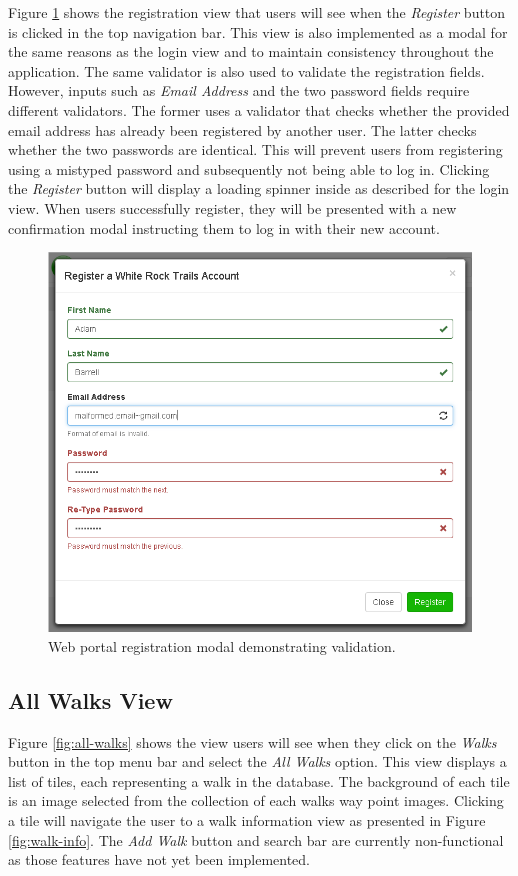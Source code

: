 \documentclass[11pt,a4paper]{article}
\begin{document}
Figure \ref{fig:registration} shows the registration view that users will see when the \emph{Register} button is clicked in the top navigation bar. This view is also implemented as a modal for the same reasons as the login view and to maintain consistency throughout the application. The same validator is also used to validate the registration fields. However, inputs such as \emph{Email Address} and the two password fields require different validators. The former uses a validator that checks whether the provided email address has already been registered by another user. The latter checks whether the two passwords are identical. This will prevent users from registering using a mistyped password and subsequently not being able to log in. Clicking the \emph{Register} button will display a loading spinner inside as described for the login view. When users successfully register, they will be presented with a new confirmation modal instructing them to log in with their new account.

\begin{figure}[H]
\centering
\includegraphics[width=0.8\linewidth]{./img/webportal/registration}
\caption{Web portal registration modal demonstrating validation.}
\label{fig:registration}
\end{figure}

\subsection{All Walks View}

Figure \ref{fig:all-walks} shows the view users will see when they click on the \emph{Walks} button in the top menu bar and select the \emph{All Walks} option. This view displays a list of tiles, each representing a walk in the database. The background of each tile is an image selected from the collection of each walks way point images. Clicking a tile will navigate the user to a walk information view as presented in Figure \ref{fig:walk-info}. The \emph{Add Walk} button and search bar are currently non-functional as those features have not yet been implemented.
\end{document}

